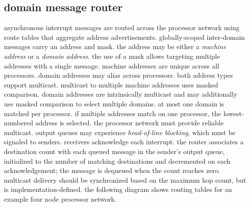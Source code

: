 \newpage
\subsection{domain message router}

asynchronous interrupt messages are routed across the processor network
using route tables that aggregate address advertisements.
globally-scoped inter-domain messages carry an address and mask.
the address may be either a \emph{machine address} or a \emph{domain address}.
the use of a mask allows targeting multiple addresses with a single message.
\para
machine addresses are unique across all processors.
domain addresses may alias across processors.
both address types support multicast.
multicast to multiple machine addresses uses masked comparison.
domain addresses are intrinsically multicast and may additionally use
masked comparison to select multiple domains. at most one domain is
matched per processor. if multiple addresses match on one processor,
the lowest-numbered address is selected.
\para
the processor network must provide reliable multicast.
output queues may experience \emph{head-of-line blocking}, which
must be signaled to senders. receivers acknowledge each interrupt.
the router associates a destination count with each queued message
in the sender's output queue, initialized to the number of matching
destinations and decremented on each acknowledgement; the message is
dequeued when the count reaches zero.
multicast delivery should be synchronized based on the maximum
hop count, but is implementation-defined.
\para
the following diagram shows routing tables for an example four node
processor network.
\\

